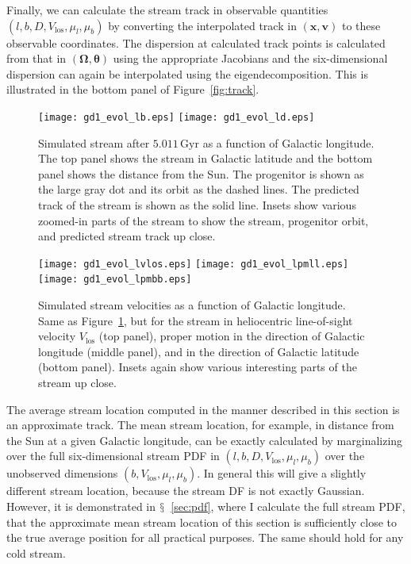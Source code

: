 \documentclass[12pt,preprint]{aastex}
\renewcommand{\figurename}{Figure}
\newcommand{\sectionname}{$\mathsection$}
\renewcommand{\vec}[1]{\ensuremath{\mathbf{#1}}}
\newcommand{\vecx}{\ensuremath{\vec{x}}}
\newcommand{\vecv}{\ensuremath{\vec{v}}}
\newcommand{\veco}{\ensuremath{\vec{\Omega}}}
\newcommand{\veca}{\ensuremath{\boldsymbol\theta}}
\newcommand{\Gyr}{\ensuremath{\,\mathrm{Gyr}}}
\newcommand{\vlos}{\ensuremath{V_{\mathrm{los}}}}
\newcommand{\pmll}{\ensuremath{\mu_l}}
\newcommand{\pmbb}{\ensuremath{\mu_b}}
\begin{document}
Finally, we can calculate the stream track in observable quantities
$(l,b,D,\vlos,\pmll,\pmbb)$ by converting the interpolated track in
$(\vecx,\vecv)$ to these observable coordinates. The dispersion at
calculated track points is calculated from that in $(\veco,\veca)$
using the appropriate Jacobians and the six-dimensional dispersion can
again be interpolated using the eigendecomposition. This is
illustrated in the bottom panel of \figurename~\ref{fig:track}.

\begin{figure}[t!]
  \texttt{[image: gd1\_evol\_lb.eps]}
  \texttt{[image: gd1\_evol\_ld.eps]}
  \caption{Simulated stream after $5.011\Gyr$ as a function of Galactic
    longitude. The top panel shows the stream in Galactic latitude and
    the bottom panel shows the distance from the Sun. The progenitor
    is shown as the large gray dot and its orbit as the dashed
    lines. The predicted track of the stream is shown as the solid
    line. Insets show various zoomed-in parts of the stream to show
    the stream, progenitor orbit, and predicted stream track up
    close.}\label{fig:gd1_lbd}
\end{figure}

\begin{figure}[tp!!]
  \texttt{[image: gd1\_evol\_lvlos.eps]}
  \texttt{[image: gd1\_evol\_lpmll.eps]}
  \texttt{[image: gd1\_evol\_lpmbb.eps]}
  \caption{Simulated stream velocities as a function of Galactic
    longitude. Same as \figurename~\ref{fig:gd1_lbd}, but for the
    stream in heliocentric line-of-sight velocity $V_{\mathrm{los}}$
    (top panel), proper motion in the direction of Galactic longitude
    (middle panel), and in the direction of Galactic latitude (bottom
    panel). Insets again show various interesting parts of the stream
    up close.}\label{fig:gd1_lbv}
\end{figure}

The average stream location computed in the manner described in this
section is an approximate track. The mean stream location, for
example, in distance from the Sun at a given Galactic longitude, can
be exactly calculated by marginalizing over the full six-dimensional
stream PDF in $(l,b,D,\vlos,\pmll,\pmbb)$ over the unobserved
dimensions $(b,\vlos,\pmll,\pmbb)$. In general this will give a
slightly different stream location, because the stream DF is not
exactly Gaussian. However, it is demonstrated in
\sectionname~\ref{sec:pdf}, where I calculate the full stream PDF,
that the approximate mean stream location of this section is
sufficiently close to the true average position for all practical
purposes. The same should hold for any cold stream.
\end{document}

